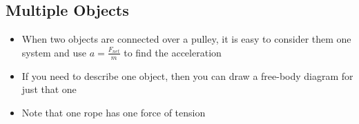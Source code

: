 \subsection{Multiple Objects}
\begin{itemize}
    \item When two objects are connected over a pulley, it is easy to consider them one system and use \(a=
    \frac{F_{net}}{m}\) to find the acceleration
    \item If you need to describe one object, then you can draw a free-body diagram for just that one
    \item Note that one rope has one force of tension
\end{itemize}